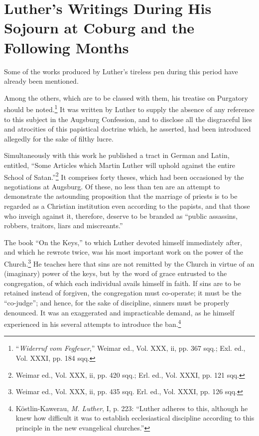 \section{Luther’s Writings During His Sojourn at Coburg and the Following Months}

Some of the works produced by Luther’s tireless pen during this
period have already been mentioned.

Among the others, which are to be classed with them, his treatise
on Purgatory should be noted.\footnote
{“\textit{Widerruf vom Fegfeuer},” Weimar ed., Vol. XXX, ii, pp. 367 sqq.; Exl. ed., Vol.
XXXI, pp. 184 sqq.}
It was written by Luther to supply
the absence of any reference to this subject in the Augsburg Confession,
and to disclose all the disgraceful lies and atrocities of this papistical
doctrine which, he asserted, had been introduced allegedly for
the sake of filthy lucre.

Simultaneously with this work he published a tract in German and
Latin, entitled, “Some Articles which Martin Luther will uphold
against the entire School of Satan.”\footnote
{Weimar ed., Vol. XXX, ii, pp. 420 sqq.; Erl. ed., Vol. XXXI, pp. 121 sqq.}
It comprises forty theses, which
had been occasioned by the negotiations at Augsburg. Of these, no
less than ten are an attempt to demonstrate the astounding proposition
that the marriage of priests is to be regarded as a Christian institution
even according to the papists, and that those who inveigh
against it, therefore, deserve to be branded as “public assassins, robbers,
traitors, liars and miscreants.”

The book “On the Keys,” to which Luther devoted himself immediately
after, and which he rewrote twice, was his most important
work on the power of the Church.\footnote{Weimar ed., Vol. XXX, ii, pp. 435 sqq. Erl. ed., Vol. XXXI, pp. 126 sqq.}
He teaches here that sins are
not remitted by the Church in virtue of an (imaginary) power of the
keys, but by the word of grace entrusted to the congregation, of
which each individual avails himself in faith. If sins are to be retained
instead of forgiven, the congregation must co-operate; it must be the
“co-judge”; and hence, for the sake of discipline, sinners must be
properly denounced. It was an exaggerated and impracticable demand,
as he himself experienced in his several attempts to introduce
the ban.\footnote
{Köstlin-Kawerau, \textit{M. Luther}, I, p. 223: “Luther adheres to this, although he knew
how difficult it was to establish ecclesiastical discipline according to this principle in the
new evangelical churches.”}


